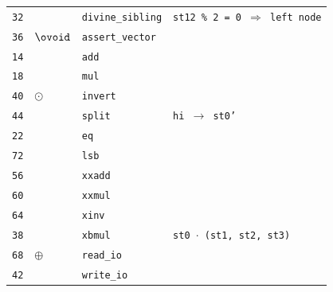 \documentclass{article}
\makeatletter
\newcommand\incircbin
{\mathpalette\@incircbin}
\newcommand\@incircbin[2]
{\mathbin{\ooalign{\hidewidth$#1#2$\hidewidth\crcr$#1\ovoid$}}}
\newcommand{\ocol}{\incircbin{\raisebox{0.4pt}{:}}}
\newcommand{\shrinkstack}[1]{\tikzmarknode[fill=instr-shrink-stack,circle,inner sep=-1pt]{circ}{#1}}
\newcommand{\hintdivinesib}{
    \textcolor{hint}{\texttt{st12 \% 2 = 0 $\Rightarrow$ left node}}
}
\newcommand{\hintsplit}{
    \textcolor{hint}{\texttt{hi $\rightarrow$ st0'}}
}
\newcommand{\hintxbmul}{
    \textcolor{hint}{\texttt{st0 $\cdot$ (st1, st2, st3)}}
}
\newcommand{\ssominus}{
    \shrinkstack{\ensuremath{\ominus}}
}
\newcommand{\ssocol}{
    \raisebox{6pt}{\shrinkstack{\raisebox{-6pt}{\ensuremath{\ocol}}}} %
}
\makeatother
\begin{document}
\begin{minipage}{0.3\textwidth}
\begin{tabular}{rlll}
    \texttt{32} &                                  & \texttt{divine\_sibling}                           & \hintdivinesib \\
    \texttt{36} & $\ovoid$                         & \texttt{assert\_vector}                            &                \\
    \texttt{14} & \ssocol                          & \texttt{add}                                       &                \\
    \texttt{18} & \ssocol                          & \texttt{mul}                                       &                \\
    \texttt{40} & $\odot$                          & \texttt{invert}                                    &                \\
    \texttt{44} &                                  & \texttt{split}                                     & \hintsplit     \\
    \texttt{22} & \ssocol                          & \texttt{eq}                                        &                \\
    \texttt{72} &                                  & \texttt{lsb}                                       &                \\
    \texttt{56} &                                  & \texttt{xxadd}                                     &                \\
    \texttt{60} &                                  & \texttt{xxmul}                                     &                \\
    \texttt{64} &                                  & \texttt{xinv}                                      &                \\
    \texttt{38} & \shrinkstack{\phantom{$\ovoid$}} & \texttt{xbmul}                                     & \hintxbmul     \\
    \texttt{68} & $\oplus$                         & \texttt{read\_io}                                  &                \\
    \texttt{42} & \ssominus                        & \texttt{write\_io}                                 &
\end{tabular}
\end{minipage}\hfill%
\end{document}
